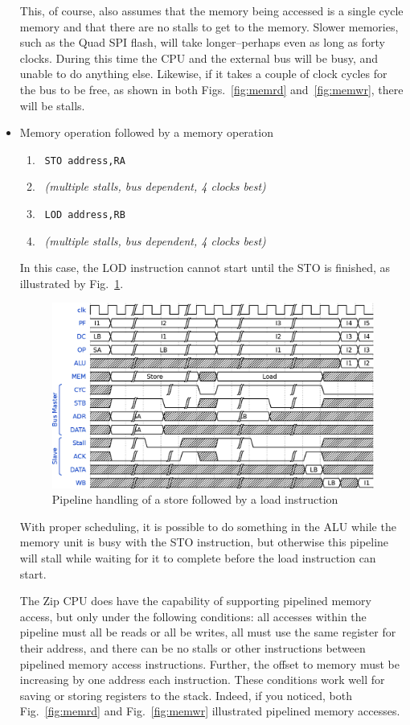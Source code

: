 \documentclass{gqtekspec}
\begin{document}
\begin{itemize}
This, of course, also assumes that the memory being accessed is a single cycle
memory and that there are no stalls to get to the memory.
Slower memories, such as the Quad SPI flash, will take longer--perhaps even
as long as forty clocks.   During this time the CPU and the external bus 
will be busy, and unable to do anything else.  Likewise, if it takes a couple
of clock cycles for the bus to be free, as shown in both Figs.~\ref{fig:memrd}
and~\ref{fig:memwr}, there will be stalls.

\item Memory operation followed by a memory operation
\begin{enumerate}
\item\ {\tt STO address,RA}
\item\ {\em (multiple stalls, bus dependent, 4 clocks best)}
\item\ {\tt LOD address,RB}
\item\ {\em (multiple stalls, bus dependent, 4 clocks best)}
\end{enumerate}

In this case, the LOD instruction cannot start until the STO is finished,
as illustrated by Fig.~\ref{fig:mstld}.
\begin{figure}\begin{center}
\includegraphics[width=5.5in]{../gfx/mstld.eps}
\caption{Pipeline handling of a store followed by a load instruction}\label{fig:mstld}
\end{center}\end{figure}
With proper scheduling, it is possible to do something in the ALU while the
memory unit is busy with the STO instruction, but otherwise this pipeline will
stall while waiting for it to complete before the load instruction can
start.

The Zip CPU does have the capability of supporting pipelined memory access,
but only under the following conditions: all accesses within the pipeline
must all be reads or all be writes, all must use the same register for their
address, and there can be no stalls or other instructions between pipelined
memory access instructions.  Further, the offset to memory must be increasing
by one address each instruction.  These conditions work well for saving or
storing registers to the stack.  Indeed, if you noticed, both
Fig.~\ref{fig:memrd} and Fig.~\ref{fig:memwr} illustrated pipelined memory
accesses.

\end{itemize}
\end{document}
